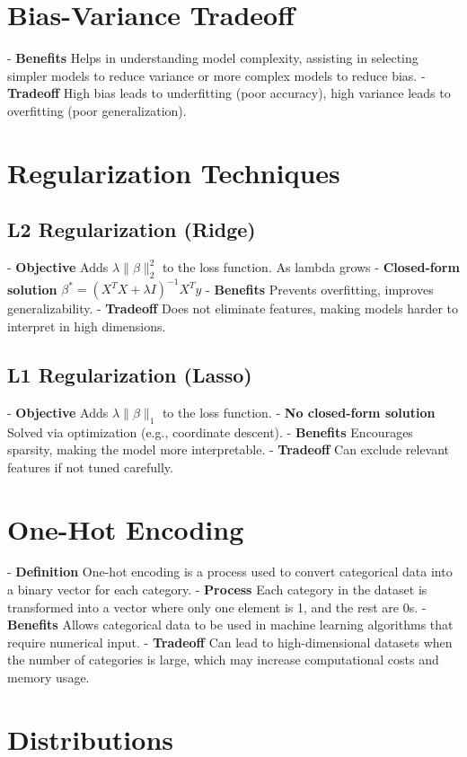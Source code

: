 \documentclass[10pt]{article}
\begin{document}
\begin{multicols}{2}
\section*{Bias-Variance Tradeoff}
- \textbf{Benefits} Helps in understanding model complexity, assisting in selecting simpler models to reduce variance or more complex models to reduce bias.
- \textbf{Tradeoff} High bias leads to underfitting (poor accuracy), high variance leads to overfitting (poor generalization).

\section*{Regularization Techniques}
\subsection*{L2 Regularization (Ridge)}
- \textbf{Objective} Adds $\lambda \|\beta\|_2^2$ to the loss function. As lambda grows
- \textbf{Closed-form solution} $\beta^* = (X^TX + \lambda I)^{-1}X^Ty$
- \textbf{Benefits} Prevents overfitting, improves generalizability.
- \textbf{Tradeoff} Does not eliminate features, making models harder to interpret in high dimensions.

\subsection*{L1 Regularization (Lasso)}
- \textbf{Objective} Adds $\lambda \|\beta\|_1$ to the loss function.
- \textbf{No closed-form solution} Solved via optimization (e.g., coordinate descent).
- \textbf{Benefits} Encourages sparsity, making the model more interpretable.
- \textbf{Tradeoff} Can exclude relevant features if not tuned carefully.

\section*{One-Hot Encoding}
- \textbf{Definition} One-hot encoding is a process used to convert categorical data into a binary vector for each category.
- \textbf{Process} Each category in the dataset is transformed into a vector where only one element is 1, and the rest are 0s.
- \textbf{Benefits} Allows categorical data to be used in machine learning algorithms that require numerical input.
- \textbf{Tradeoff} Can lead to high-dimensional datasets when the number of categories is large, which may increase computational costs and memory usage.

\section*{Distributions}


\end{multicols}
\end{document}
